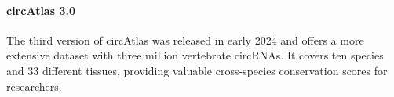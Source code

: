 \paragraph{circAtlas 3.0}
The third version of circAtlas was released in early 2024 and offers a more
extensive dataset with three million vertebrate circRNAs.
It covers ten species and 33 different tissues, providing valuable
cross-species conservation scores for researchers\supercite{wu_circatlas_2023}.
